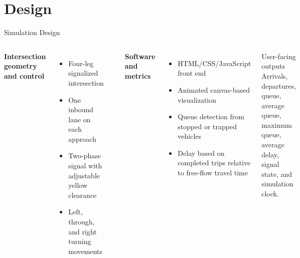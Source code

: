 \documentclass[aspectratio=169]{beamer}
\begin{document}
\section{Design}
\begin{frame}[shrink=4]{Simulation Design}
  \begin{columns}[T,totalwidth=\textwidth]
    \textbf{Intersection geometry and control}
    \begin{itemize}
      \item Four-leg signalized intersection
      \item One inbound lane on each approach
      \item Two-phase signal with adjustable yellow clearance
      \item Left, through, and right turning movements
    \end{itemize}

    \begin{center}
    \end{center}

    \textbf{Software and metrics}
    \begin{itemize}
      \item HTML/CSS/JavaScript front end
      \item Animated canvas-based visualization
      \item Queue detection from stopped or trapped vehicles
      \item Delay based on completed trips relative to free-flow travel time
    \end{itemize}

    \vspace{0.5em}
    \begin{block}{User-facing outputs}
      Arrivals, departures, queue, average queue, maximum queue, average delay, signal state, and simulation clock.
    \end{block}
  \end{columns}
\end{frame}
\end{document}
